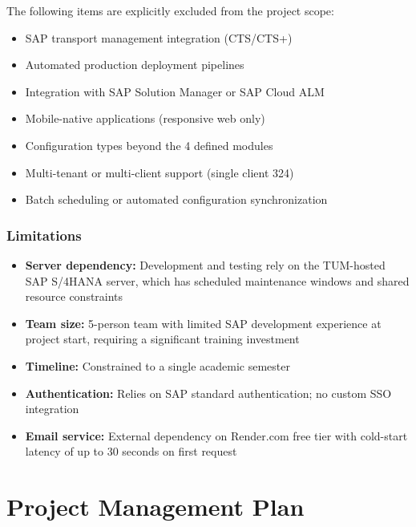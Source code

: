 \documentclass[12pt,a4paper]{report}
\begin{document}
The following items are explicitly excluded from the project scope:

\begin{itemize}[leftmargin=2em]
  \item SAP transport management integration (CTS/CTS+)
  \item Automated production deployment pipelines
  \item Integration with SAP Solution Manager or SAP Cloud ALM
  \item Mobile-native applications (responsive web only)
  \item Configuration types beyond the 4 defined modules
  \item Multi-tenant or multi-client support (single client 324)
  \item Batch scheduling or automated configuration synchronization
\end{itemize}

\subsection{Limitations}

\begin{itemize}[leftmargin=2em]
  \item \textbf{Server dependency:} Development and testing rely on the TUM-hosted SAP S/4HANA server, which has scheduled maintenance windows and shared resource constraints
  \item \textbf{Team size:} 5-person team with limited SAP development experience at project start, requiring a significant training investment
  \item \textbf{Timeline:} Constrained to a single academic semester
  \item \textbf{Authentication:} Relies on SAP standard authentication; no custom SSO integration
  \item \textbf{Email service:} External dependency on Render.com free tier with cold-start latency of up to 30 seconds on first request
\end{itemize}


\clearpage
\chapter{Project Management Plan}
\end{document}
